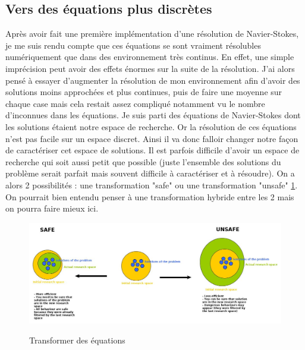 \documentclass[10pt]{article}
\begin{document}
\subsection{Vers des équations plus discrètes}
Après avoir fait une première implémentation d'une résolution de Navier-Stokes, je me suis rendu compte que ces équations se sont vraiment résolubles numériquement que dans des environnement très continus. En effet, une simple imprécision peut avoir des effets énormes sur la suite de la résolution. J'ai alors pensé à essayer d'augmenter la résolution de mon environnement afin d'avoir des solutions moins approchées et plus continues, puis de faire une moyenne sur chaque case mais cela restait assez compliqué notamment vu le nombre d'inconnues dans les équations.
Je suis parti des équations de Navier-Stokes dont les solutions étaient notre espace de recherche. Or la résolution de ces équations n'est pas facile sur un espace discret. Ainsi il va donc falloir changer notre façon de caractériser cet espace de solutions. Il est parfois difficile d'avoir un espace de recherche qui soit aussi petit que possible (juste l'ensemble des solutions du problème serait parfait mais souvent difficile à caractériser et à résoudre). On a alors 2 possibilités : une transformation "safe" ou une transformation "unsafe" \ref{safe_unsafe}. On pourrait bien entendu penser à une transformation hybride entre les 2 mais on pourra faire mieux ici.\\
\begin{figure}[!h]
\centering
\includegraphics[scale=0.4]{transfo_espace_recherche.jpg}\\
\caption{Transformer des équations}
\label{safe_unsafe}
\end{figure}
\end{document}

